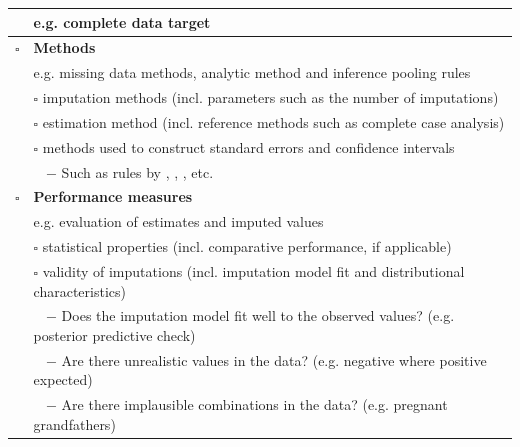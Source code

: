 \documentclass[bimj,fleqn]{w-art}
\begin{document}
\begin{table}[ht!]
\begin{tabular}{ll}
  & e.g. complete data target                                                                      \\ \hline
$\square$ & \textbf{Methods}                                                                               \\
  & e.g. missing data methods, analytic method and inference pooling rules                                    \\ \cline{2-2} 
  & $\square$ imputation methods (incl. parameters such as the number of   imputations)                    \\
  & $\square$ estimation method (incl. reference methods such as complete   case analysis)                 \\
  & $\square$ methods used to construct standard errors and confidence intervals \\ 
  & $\;\;$ $-$ Such as rules by \citet{rubi87}, \citet{bar99}, \citet{rei03}, etc.    \\ \hline
$\square$ & \textbf{Performance measures}                                                           \\      
  & e.g. evaluation of estimates and imputed values                                                \\ \cline{2-2} 
  & $\square$ statistical properties (incl. comparative performance, if   applicable)                      \\
  & $\square$ validity of imputations (incl. imputation model fit and distributional characteristics)    \\ 
  & $\;\;$ $-$ Does the imputation model fit well to the observed values? (e.g. posterior predictive check)   \\ 
  & $\;\;$ $-$ Are there unrealistic values in the data? (e.g. negative where positive expected)   \\ 
  & $\;\;$ $-$ Are there implausible combinations in the data? (e.g. pregnant grandfathers)   \\ \hline
  
\end{tabular}
\end{table}






\end{document}
